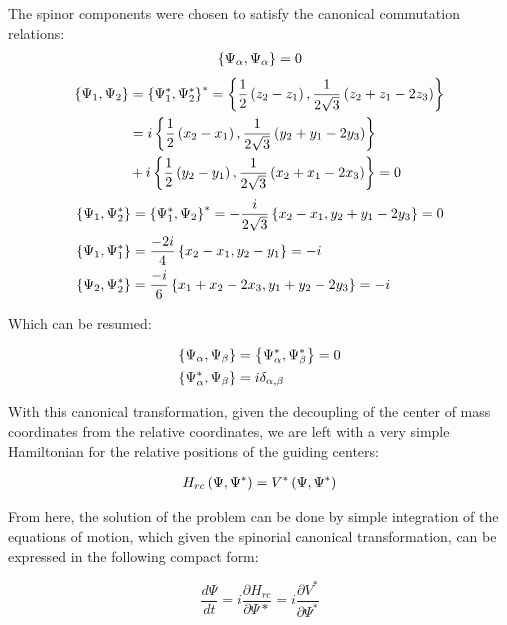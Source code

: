 The spinor components were chosen to satisfy the canonical commutation relations:
\begin{align*}
\left\lbrace \Psi_\alpha, \Psi_\alpha \right\rbrace &= 0\\ 
\end{align*}
\small
\begin{align*}
\left\lbrace \Psi_1, \Psi_2 \right\rbrace &= \left\lbrace \Psi_1^*, \Psi_2^* \right\rbrace^* = \left\lbrace \frac{1}{2}\left( z_{2}-z_{1} \right), \frac{1}{2\sqrt{3}}\left( z_{2}+z_{1}-2z_{3} \right) \right\rbrace \\
&= i\left\lbrace \frac{1}{2}\left( x_{2}-x_{1} \right), \frac{1}{2\sqrt{3}}\left( y_{2}+y_{1}-2y_{3} \right) \right\rbrace\\
&+ i\left\lbrace \frac{1}{2}\left( y_{2}-y_{1} \right), \frac{1}{2\sqrt{3}}\left( x_{2}+x_{1}-2x_{3} \right) \right\rbrace = 0\\
\end{align*}
\small
\begin{align*}
\left\lbrace \Psi_1, \Psi_2^* \right\rbrace &= \left\lbrace \Psi_1^*, \Psi_2 \right\rbrace^* = -\frac{i}{2\sqrt{3}}\left\lbrace x_{2}-x_{1}, y_{2}+y_{1}-2y_{3} \right\rbrace = 0\\
\left\lbrace \Psi_1, \Psi_1^* \right\rbrace &= \frac{-2i}{4}\left\lbrace x_{2}-x_{1}, y_2-y_1 \right\rbrace = -i\\
\left\lbrace \Psi_2, \Psi_2^* \right\rbrace &= \frac{-i}{6}\left\lbrace x_{1}+x_{2}-2x_3, y_1+y_2-2y_3 \right\rbrace = -i
\end{align*}
\normalsize

Which can be resumed:

\begin{align}
\left\lbrace \Psi_\alpha, \Psi_\beta \right\rbrace &= \left\lbrace \Psi_\alpha^*, \Psi_\beta^* \right\rbrace = 0\\
\left\lbrace \Psi_\alpha^*, \Psi_\beta \right\rbrace &= i\delta_{\alpha,\beta}
\label{eq:canonicalSpinor}
\end{align}

With this canonical transformation, given the decoupling of the center of mass coordinates from the relative coordinates, we are left with a very simple Hamiltonian for the relative positions of the guiding centers:

\begin{align}
H_{rc}\left( \Psi,\Psi^* \right) = V^*\left( \Psi,\Psi^* \right)
\label{eq:LastHam}
\end{align}

From here, the solution of the problem can be done by simple integration of the equations of motion, which given the spinorial canonical transformation, can be expressed in the following compact form:

\begin{equation}
\frac{d\Psi}{dt} =i\frac{\partial H_{rc}}{\partial\Psi*}= i\frac{\partial V^*}{\partial\Psi^*}
\end{equation}




